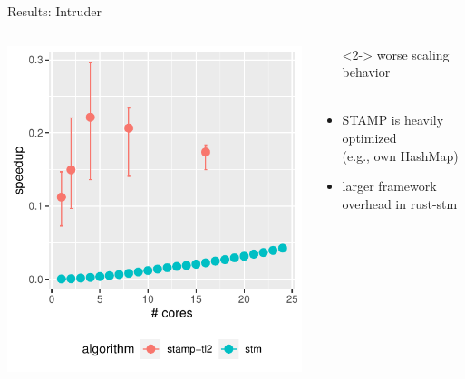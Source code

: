 \documentclass[aspectratio=169, usenames, dvipsnames]{beamer}
\newcommand{\xmark}{\ding{55}}%
\newcommand{\nope}{\rlap{$\square$}{\large\hspace{1pt}\xmark}%
\hspace{-2.5pt}}
\begin{document}
\begin{frame}{Results: Intruder}
    \begin{columns}%
        \begin{column}{0.5\textwidth}
            \centering
            \includegraphics[width=\textwidth,height=.65\textheight,keepaspectratio]{img/combined_plots/intruder+}
        \end{column}%
        \begin{column}{0.5\textwidth}
            \begin{itemize}
                \item[\nope]<2-> worse scaling behavior\\ \
            \end{itemize}

            \begin{itemize}
                \item<3-> STAMP is heavily optimized \\ (e.g., own HashMap)
                \item<4-> larger framework overhead in rust-stm
            \end{itemize}
        \end{column}
    \end{columns}
\end{frame}
\end{document}
